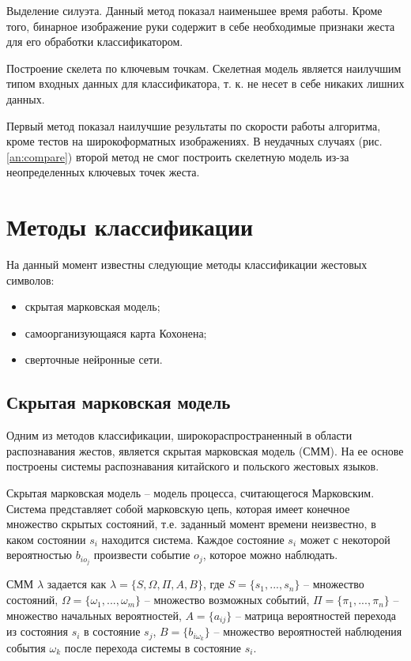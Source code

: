 Выделение силуэта. Данный метод показал наименьшее время работы. Кроме того, бинарное изображение руки содержит в себе необходимые признаки жеста для его обработки классификатором.

Построение скелета по ключевым точкам. Скелетная модель является наилучшим типом входных данных для классификатора, т. к. не несет в себе никаких лишних данных\cite{Gil}.

Первый метод показал наилучшие результаты по скорости работы алгоритма,
кроме тестов на широкоформатных изображениях. В неудачных случаях (рис. \ref{an:compare}) второй метод не смог построить скелетную модель из-за неопределенных ключевых точек жеста.

\section{Методы классификации}

На данный момент известны следующие методы классификации жестовых символов:

\begin{itemize}
	\item скрытая марковская модель\cite{Zhang,Kasprzak};
	\item самоорганизующаяся карта Кохонена\cite{Tewari2012AVR,Karn};
	\item сверточные нейронные сети\cite{Potkin,10.1007/978-3-319-16178-5_40}.
\end{itemize}

\subsection{Скрытая марковская модель}

Одним из методов классификации, широкораспространенный в области распознавания жестов, является скрытая марковская модель (СММ). На ее основе построены системы распознавания китайского\cite{Zhang} и польского\cite{Kasprzak} жестовых языков.

Скрытая марковская модель -- модель процесса, считающегося Марковским. Система представляет собой марковскую цепь, которая имеет конечное множество скрытых состояний, т.е. заданный момент времени неизвестно, в каком состоянии $s_i$ находится система. Каждое состояние $s_i$ может с некоторой вероятностью $b_{io_j}$ произвести событие $o_j$, которое можно наблюдать.

СММ $\lambda$ задается как $\lambda = \{S, \Omega, \Pi, A, B\}$, где $S=\{s_1, ..., s_n\}$ -- множество состояний, $\Omega = \{\omega_1, ..., \omega_m\}$ -- множество возможных событий, $\Pi = \{\pi_1, ..., \pi_n\}$ -- множество начальных вероятностей, $A = \{a_{ij}\}$ -- матрица вероятностей перехода из состояния $s_i$ в состояние $s_j$, $B = \{b_{i\omega_k}\}$ -- множество вероятностей наблюдения события $\omega_k$ после перехода системы в состояние $s_i$.

